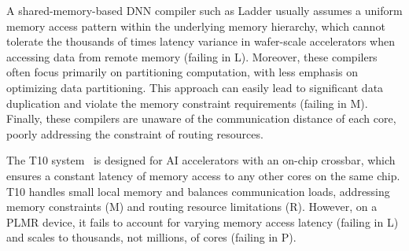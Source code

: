 A shared-memory-based DNN compiler such as Ladder usually assumes a uniform memory access pattern within the underlying memory hierarchy, which cannot tolerate the thousands of times latency variance in wafer-scale accelerators when accessing data from remote memory (failing in L).
Moreover, these compilers~\cite{tvm,rammer,ansor,flextensor,roller,welder,ladder} often focus primarily on partitioning computation, with less emphasis on optimizing data partitioning. This approach can easily lead to significant data duplication and violate the memory constraint requirements (failing in M).
Finally, these compilers are unaware of the communication distance of each core, poorly addressing the constraint of routing resources.

 The T10 system~\cite{t10} is designed for AI accelerators with an on-chip crossbar, which ensures a constant latency of memory access to any other cores on the same chip. T10 handles small local memory and balances communication loads, addressing memory constraints (M) and routing resource limitations (R). However, on a PLMR device, it fails to account for varying memory access latency (failing in L) and scales to thousands, not millions, of cores (failing in P).
